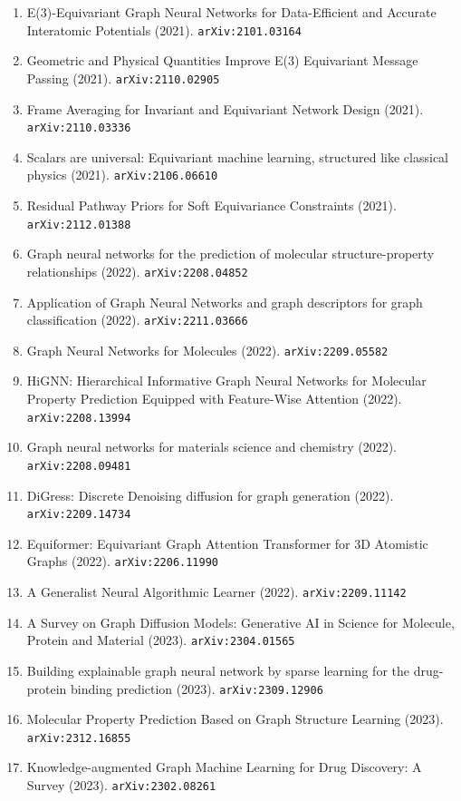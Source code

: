 \documentclass[11pt]{article}
\begin{document}
\begin{enumerate}
  \item E(3)-Equivariant Graph Neural Networks for Data-Efficient and Accurate
  Interatomic Potentials (2021). \texttt{arXiv:2101.03164}
  \item Geometric and Physical Quantities Improve E(3) Equivariant Message
  Passing (2021). \texttt{arXiv:2110.02905}
  \item Frame Averaging for Invariant and Equivariant Network Design (2021). \texttt{arXiv:2110.03336}
  \item Scalars are universal: Equivariant machine learning, structured like
  classical physics (2021). \texttt{arXiv:2106.06610}
  \item Residual Pathway Priors for Soft Equivariance Constraints (2021). \texttt{arXiv:2112.01388}
  \item Graph neural networks for the prediction of molecular structure-property
  relationships (2022). \texttt{arXiv:2208.04852}
  \item Application of Graph Neural Networks and graph descriptors for graph
  classification (2022). \texttt{arXiv:2211.03666}
  \item Graph Neural Networks for Molecules (2022). \texttt{arXiv:2209.05582}
  \item HiGNN: Hierarchical Informative Graph Neural Networks for Molecular
  Property Prediction Equipped with Feature-Wise Attention (2022). \texttt{arXiv:2208.13994}
  \item Graph neural networks for materials science and chemistry (2022). \texttt{arXiv:2208.09481}
  \item DiGress: Discrete Denoising diffusion for graph generation (2022). \texttt{arXiv:2209.14734}
  \item Equiformer: Equivariant Graph Attention Transformer for 3D Atomistic
  Graphs (2022). \texttt{arXiv:2206.11990}
  \item A Generalist Neural Algorithmic Learner (2022). \texttt{arXiv:2209.11142}
  \item A Survey on Graph Diffusion Models: Generative AI in Science for
  Molecule, Protein and Material (2023). \texttt{arXiv:2304.01565}
  \item Building explainable graph neural network by sparse learning for the
  drug-protein binding prediction (2023). \texttt{arXiv:2309.12906}
  \item Molecular Property Prediction Based on Graph Structure Learning (2023). \texttt{arXiv:2312.16855}
  \item Knowledge-augmented Graph Machine Learning for Drug Discovery: A Survey (2023). \texttt{arXiv:2302.08261}

\end{enumerate}
\end{document}
